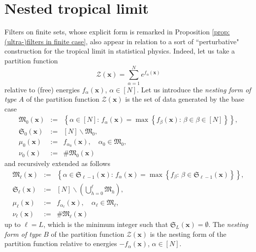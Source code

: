\documentclass[11pt,british,reqno]{article}
\numberwithin{equation}{section}
\numberwithin{figure}{section}
\numberwithin{table}{section}
\theoremstyle{definition}
\theoremstyle{definition}
\theoremstyle{plain}
\theoremstyle{plain}
\theoremstyle{remark}
\theoremstyle{plain}
\numberwithin{equation}{section}
\numberwithin{figure}{section}
\numberwithin{table}{section}
\theoremstyle{plain}
\begin{document}
\section{\label{sec: Perturbative tropical limit} Nested tropical limit}

Filters on finite sets, whose explicit form is remarked in Proposition \ref{prop: (ultra-)filters in finite case}, also appear in relation to a sort of ``perturbative" construction for the tropical limit in statistical physics. Indeed, let us take a partition function 
\begin{equation}
{\displaystyle \mathcal{Z}(\boldsymbol{x})=\sum_{\alpha=1}^{N}e^{f_{\alpha}(\boldsymbol{x})}}\label{eq: partition function}
\end{equation}
 relative to (free) energies $f_{\alpha}(\boldsymbol{x})$, $\alpha\in[N]$.
Let us introduce the \textit{nesting form of type}
$A$ of the partition function $\mathcal{Z}(\boldsymbol{x})$ is the
set of data generated by the base case 
\begin{eqnarray}
\mathfrak{M}_{0}(\boldsymbol{x}) & := & \left\{ \alpha\in[N]:\,f_{\alpha}(\boldsymbol{x})=\max\left\{ f_{\beta}(\boldsymbol{x}):\,\beta\in\beta\in[N]\right\} \right\} ,\nonumber \\
\mathfrak{S}_{0}(\boldsymbol{x}) & := & [N]\backslash\mathfrak{M}_{0},\nonumber \\
\mu_{0}(\boldsymbol{x}) & := & f_{\alpha_{0}}(\boldsymbol{x}),\quad\alpha_{0}\in\mathfrak{M}_{0},\nonumber \\
\nu_{0}(\boldsymbol{x}) & := & \#\mathfrak{M}_{0}(\boldsymbol{x})
\label{eq: nesting data, base}
\end{eqnarray}
and recursively extended as follows 
\begin{eqnarray}
\mathfrak{M}_{\ell}(\boldsymbol{x}) & := & \left\{ \alpha\in\mathfrak{S}_{\ell-1}(\boldsymbol{x}):\,f_{\alpha}(\boldsymbol{x})=\max\left\{ f_{\beta}:\,\beta\in\mathfrak{S}_{\ell-1}(\boldsymbol{x})\right\} \right\} ,\nonumber \\
\mathfrak{S}_{\ell}(\boldsymbol{x}) & := & [N]\backslash\left({\displaystyle \bigcup_{h=0}^{\ell}}\mathfrak{M}_{h}\right),\nonumber \\
\mu_{\ell}(\boldsymbol{x}) & := & f_{\alpha_{\ell}}(\boldsymbol{x}),\quad\alpha_{\ell}\in\mathfrak{M}_{\ell},\nonumber \\
\nu_{\ell}(\boldsymbol{x}) & := & \#\mathfrak{M}_{\ell}(\boldsymbol{x})
\label{eq: nesting data, iteration A}
\end{eqnarray}
up to $\ell=L$, which is the minimum integer such that $\mathfrak{S}_{L}(\boldsymbol{x})=\emptyset$.
The \textit{nesting form of type} $B$ of the partition function $\mathcal{Z}(\boldsymbol{x})$
is the nesting form of the partition function relative to energies
$-f_{\alpha}(\boldsymbol{x})$, $\alpha\in[N]$. 
\end{document}
